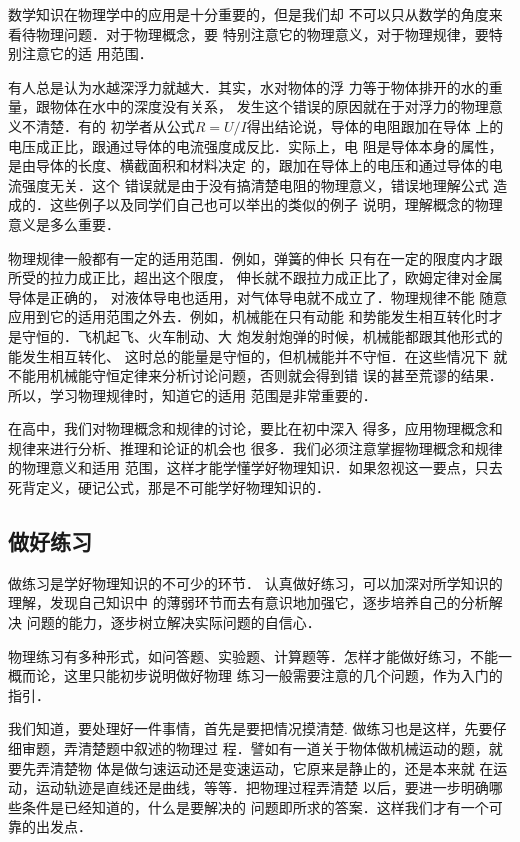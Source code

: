     数学知识在物理学中的应用是十分重要的，但是我们却
不可以只从数学的角度来看待物理问题．对于物理概念，要
特别注意它的物理意义，对于物理规律，要特别注意它的适
用范围．

    有人总是认为水越深浮力就越大．其实，水对物体的浮
力等于物体排开的水的重量，跟物体在水中的深度没有关系，
发生这个错误的原因就在于对浮力的物理意义不清楚．有的
初学者从公式$R=U/I$得出结论说，导体的电阻跟加在导体
上的电压成正比，跟通过导体的电流强度成反比．实际上，电
阻是导体本身的属性，是由导体的长度、横截面积和材料决定
的，跟加在导体上的电压和通过导体的电流强度无关．这个
错误就是由于没有搞清楚电阻的物理意义，错误地理解公式
造成的．这些例子以及同学们自己也可以举出的类似的例子
说明，理解概念的物理意义是多么重要．

    物理规律一般都有一定的适用范围．例如，弹簧的伸长
只有在一定的限度内才跟所受的拉力成正比，超出这个限度，
伸长就不跟拉力成正比了，欧姆定律对金属导体是正确的，
对液体导电也适用，对气体导电就不成立了．物理规律不能
随意应用到它的适用范围之外去．例如，机械能在只有动能
和势能发生相互转化时才是守恒的．飞机起飞、火车制动、大
炮发射炮弹的时候，机械能都跟其他形式的能发生相互转化、
这时总的能量是守恒的，但机械能并不守恒．在这些情况下
就不能用机械能守恒定律来分析讨论问题，否则就会得到错
误的甚至荒谬的结果．所以，学习物理规律时，知道它的适用
范围是非常重要的．

    在高中，我们对物理概念和规律的讨论，要比在初中深入
得多，应用物理概念和规律来进行分析、推理和论证的机会也
很多．我们必须注意掌握物理概念和规律的物理意义和适用
范围，这样才能学懂学好物理知识．如果忽视这一要点，只去
死背定义，硬记公式，那是不可能学好物理知识的．


    \subsection*{做好练习}

做练习是学好物理知识的不可少的环节．
认真做好练习，可以加深对所学知识的理解，发现自己知识中
的薄弱环节而去有意识地加强它，逐步培养自己的分析解决
问题的能力，逐步树立解决实际问题的自信心．

物理练习有多种形式，如问答题、实验题、计算题等．怎样才能做好练习，不能一概而论，这里只能初步说明做好物理
练习一般需要注意的几个问题，作为入门的指引．

    我们知道，要处理好一件事情，首先是要把情况摸清楚.
做练习也是这样，先要仔细审题，弄清楚题中叙述的物理过
程．譬如有一道关于物体做机械运动的题，就要先弄清楚物
体是做匀速运动还是变速运动，它原来是静止的，还是本来就
在运动，运动轨迹是直线还是曲线，等等．把物理过程弄清楚
以后，要进一步明确哪些条件是已经知道的，什么是要解决的
问题即所求的答案．这样我们才有一个可靠的出发点．

